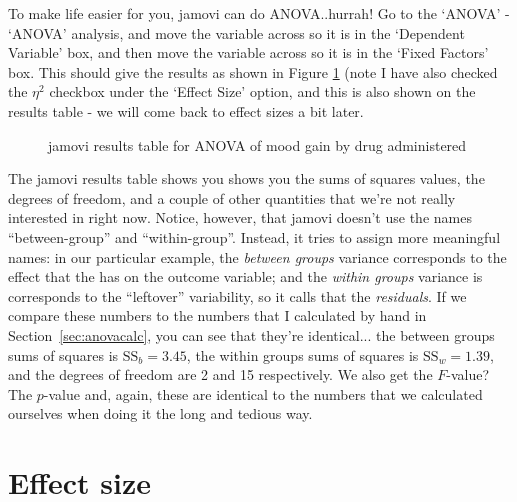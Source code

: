 To make life easier for you, jamovi can do ANOVA..hurrah! Go to the `ANOVA' - `ANOVA' analysis, and move the  variable across so it is in the `Dependent Variable' box, and then move the  variable across so it is in the `Fixed Factors' box. This should give the results as shown in Figure \ref{fig:anova2} (note I have also checked the $\eta^2$ checkbox under the `Effect Size' option, and this is also shown on the results table - we will come back to effect sizes a bit later.

\begin{figure}[h]
\begin{center}
\caption{jamovi results table for ANOVA of mood gain by drug administered}
\HR
\label{fig:anova2}
\end{center}
\end{figure}

The jamovi results table shows you shows you the sums of squares values, the degrees of freedom, and a couple of other quantities that we're not really interested in right now. Notice, however, that jamovi doesn't use the names ``between-group'' and ``within-group''. Instead, it tries to assign more meaningful names: in our particular example, the {\it between groups} variance corresponds to the effect that the  has on the outcome variable; and the {\it within groups} variance is corresponds to the ``leftover'' variability, so it calls that the {\it residuals}. If we compare these numbers to the numbers that I calculated by hand in Section~\ref{sec:anovacalc}, you can see that they're identical... the between groups sums of squares is $\mbox{SS}_b = 3.45$, the within groups sums of squares is $\mbox{SS}_w = 1.39$, and the degrees of freedom are 2 and 15 respectively. We also get the $F$-value? The $p$-value and, again, these are identical to the numbers that we calculated ourselves when doing it the long and tedious way. 


\section{Effect size\label{sec:etasquared}}

